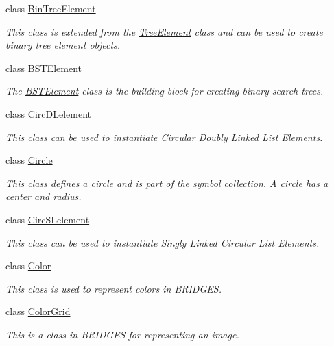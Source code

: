 \begin{DoxyCompactItemize}
class \hyperlink{classbridges_1_1base_1_1_bin_tree_element}{Bin\+Tree\+Element}
\begin{DoxyCompactList}\small\item\em This class is extended from the \hyperlink{classbridges_1_1base_1_1_tree_element}{Tree\+Element} class and can be used to create binary tree element objects. \end{DoxyCompactList}\item 
class \hyperlink{classbridges_1_1base_1_1_b_s_t_element}{B\+S\+T\+Element}
\begin{DoxyCompactList}\small\item\em The \hyperlink{classbridges_1_1base_1_1_b_s_t_element}{B\+S\+T\+Element} class is the building block for creating binary search trees. \end{DoxyCompactList}\item 
class \hyperlink{classbridges_1_1base_1_1_circ_d_lelement}{Circ\+D\+Lelement}
\begin{DoxyCompactList}\small\item\em This class can be used to instantiate Circular Doubly Linked List Elements. \end{DoxyCompactList}\item 
class \hyperlink{classbridges_1_1base_1_1_circle}{Circle}
\begin{DoxyCompactList}\small\item\em This class defines a circle and is part of the symbol collection. A circle has a center and radius. \end{DoxyCompactList}\item 
class \hyperlink{classbridges_1_1base_1_1_circ_s_lelement}{Circ\+S\+Lelement}
\begin{DoxyCompactList}\small\item\em This class can be used to instantiate Singly Linked Circular List Elements. \end{DoxyCompactList}\item 
class \hyperlink{classbridges_1_1base_1_1_color}{Color}
\begin{DoxyCompactList}\small\item\em This class is used to represent colors in B\+R\+I\+D\+G\+ES. \end{DoxyCompactList}\item 
class \hyperlink{classbridges_1_1base_1_1_color_grid}{Color\+Grid}
\begin{DoxyCompactList}\small\item\em This is a class in B\+R\+I\+D\+G\+ES for representing an image. \end{DoxyCompactList}\item 

\end{DoxyCompactItemize}
